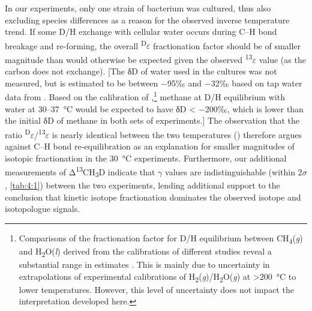 In our experiments, only one strain of bacterium was cultured, thus also
excluding species differences as a reason for the observed inverse
temperature trend. If some D/H exchange with cellular water occurs
during C--H bond breakage and re-forming, the overall
\textsuperscript{D}$\varepsilon$ fractionation factor should be of smaller magnitude
than would otherwise be expected given the observed
\textsuperscript{13}$\varepsilon$ value (as the carbon does not exchange). {[}The δD
of water used in the cultures was not measured, but is estimated to be
between $-$95‰ and $-$32‰ based on tap water data from \textcite{Bowen++_2007_WRR}.
Based on the calibration of \textcite{Horibe+Craig_1995_GCA},\footnote{Comparisons
	of the fractionation factor for D/H equilibrium between
	CH\textsubscript{4}(\emph{g}) and H\textsubscript{2}O(\emph{l})
	derived from the calibrations of different studies reveal a
	substantial range in estimates \parencite[up to 30‰ at 30--37~°C, see][]{Wang++_2015_S}. This is mainly due to uncertainty in extrapolations of
	experimental calibrations of
	H\textsubscript{2}(\emph{g})/H\textsubscript{2}O(\emph{g}) at
	\textgreater{}200~°C to lower temperatures. However, this level of
	uncertainty does not impact the interpretation developed here.}
methane at D/H equilibrium with water at 30--37~°C would be expected to
have δD \textless{} $-$200‰, which is lower than the initial δD of methane
in both sets of experiments.{]} The observation that the ratio
\textsuperscript{D}$\varepsilon$/\textsuperscript{13}$\varepsilon$ is nearly identical between
the two temperatures () therefore argues against C--H bond
re-equilibration as an explanation for smaller magnitudes of isotopic
fractionation in the 30~°C experiments. Furthermore, our additional
measurements of Δ\textsuperscript{13}CH\textsubscript{3}D indicate that
$\gamma$ values are indistinguishable (within 2$\sigma$, \autoref{tab:4:1}) between the two
experiments, lending additional support to the conclusion that kinetic
isotope fractionation dominates the observed isotope and isotopologue
signals.

